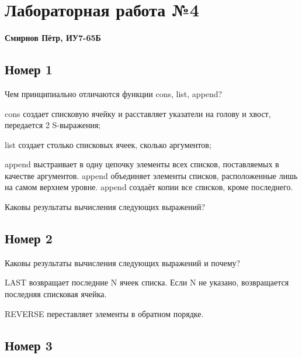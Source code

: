 \chapter{Лабораторная работа №4}

\textbf{Смирнов Пётр, ИУ7-65Б}

\section{Номер 1}

Чем принципиально отличаются функции cons, list, append?

cons создает списковую ячейку и расставляет указатели на голову и хвост, 
передается 2 S-выражения;

list создает столько списковых ячеек, сколько аргументов;

append выстраивает в одну цепочку элементы всех списков, 
поставляемых в качестве аргументов. append объединяет элементы 
списков, расположенные лишь на самом верхнем уровне. append 
создаёт копии все списков, кроме последнего.

Каковы результаты вычисления следующих выражений?

\begin{figure}[H]
    \begin{listingbox}{}
        
    \end{listingbox}
    \label{lst:1}
\end{figure}

\section{Номер 2}

Каковы результаты вычисления следующих выражений и почему?

LAST возвращает последние N ячеек списка. Если N не указано, 
возвращается последняя списковая ячейка.

REVERSE переставляет элементы в обратном порядке.

\clearpage

\begin{figure}[H]
    \begin{listingbox}{}
        
    \end{listingbox}
    \label{lst:2}
\end{figure}

\section{Номер 3}

